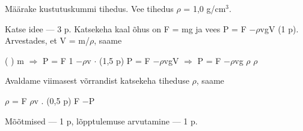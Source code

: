 
Määrake kustutuskummi tihedus. Vee tihedus $\rho$ = 1,0 g/cm$^3$.

\hint

\solu
Katse idee --- 3 p. Katsekeha kaal õhus on F = mg ja vees P = F $- \rho$vgV (1 p). Arvestades, et V = m/$\rho$, saame

( ) m $\Rightarrow$ P = F 1 $- \rho$v $\cdot$ (1,5 p) P = F $- \rho$vgV $\Rightarrow$ P = F $- \rho$vg $\rho$ $\rho$

Avaldame viimasest võrrandist katsekeha tiheduse $\rho$, saame

$\rho$ = F $\rho$v . (0,5 p) F $-$P

Mõõtmised --- 1 p, lõpptulemuse arvutamine --- 1 p.
\probend
